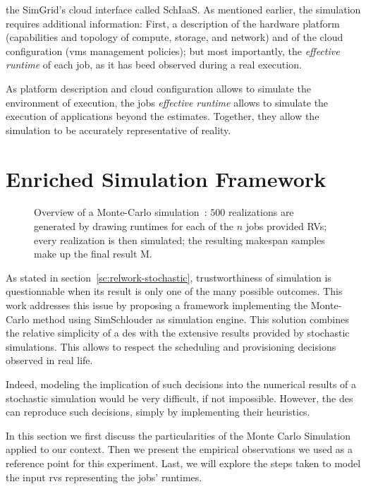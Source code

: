 \documentclass[10pt,conference,compsocconf]{IEEEtran}
\begin{document}
the SimGrid's cloud interface  called SchIaaS. As mentioned  earlier, the simulation
requires  additional information: First, a description of the hardware platform 
(capabilities and topology of compute, storage, and network) and of the cloud configuration
(\acp{vm} management policies); but most importantly, the \emph{effective runtime}
of each job, as it has beed observed during a real execution.

As platform description and cloud configuration allows to simulate the environment of 
execution, the jobs \emph{effective runtime} allows to simulate the execution of 
applications beyond the estimates. Together, they allow the simulation to be 
accurately representative of reality.

\section{Enriched Simulation Framework}\label{sec:enriched-sim}

\begin{figure}
	\centering
	\resizebox{0.5\textwidth}{!}{%
		
		}
\caption{Overview of a Monte-Carlo simulation~: $500$ realizations are generated
by drawing runtimes for each of the $n$ jobs provided RVs; every realization is
then simulated; the resulting makespan samples make up the final result M.}\label{fig:mc-process}
\end{figure}



As stated in  section~\ref{sc:relwork-stochastic}, trustworthiness of simulation
is questionnable when its result is only one of the many possible outcomes. This
work addresses this issue by  proposing a framework implementing the Monte-Carlo
method using SimSchlouder  as  simulation engine.   This  solution combines  the
relative  simplicity  of a  \ac{des}  with  the  extensive results  provided  by
stochastic simulations.   This allows to respect the scheduling and provisioning 
decisions observed in real life. 

Indeed, modeling the implication of such decisions into the numerical results
of a stochastic simulation would be very difficult, if not impossible. However,
the \ac{des} can reproduce such decisions, simply by implementing their heuristics.

In  this  section we  first  discuss  the  particularities  of the  Monte  Carlo
Simulation applied to our context. Then we present the empirical observations we
used as a reference point for this experiment. Last, we will explore the steps
taken to model the input \acp{rv} representing the jobs' runtimes.
\end{document}
